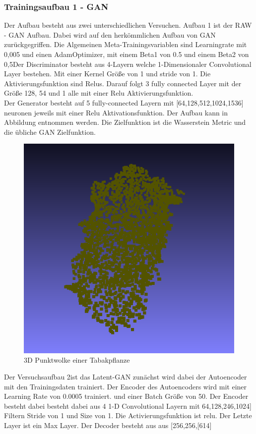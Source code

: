 \documentclass{llncs}
\begin{document}
\subsubsection{Trainingsaufbau 1 - GAN}
Der Aufbau besteht aus zwei unterschiedlichen Versuchen. Aufbau 1 ist der RAW - GAN Aufbau. Dabei wird auf den herkömmlichen Aufbau von GAN zurückgegriffen. Die Algemeinen Meta-Trainingsvariablen sind Learningrate mit 0,005 und einen AdamOptimizer, mit einem Beta1 von 0.5 und einem Beta2 von 0,5Der Discriminator besteht aus 4-Layern welche 1-Dimensionaler Convolutional Layer bestehen. Mit einer Kernel Größe von 1 und stride von 1. Die Aktivierungsfunktion sind Relus. Darauf folgt 3 fully connected Layer mit der Größe 128, 54 und 1 alle mit einer Relu Aktivierungsfunktion.
\\
Der Generator besteht auf 5 fully-connected Layern mit [64,128,512,1024,1536] neuronen jeweils mit einer Relu Aktivationsfunktion. Der Aufbau kann in Abbildung entnommen werden. Die Zielfunktion ist die Wasserstein Metric und die übliche GAN Zielfunktion. 
\begin{figure}[htbp] 
	\centering
	\includegraphics[width=1.2\textwidth]{leaf1.png}
	\caption{3D Punktwolke einer Tabakpflanze}
	\label{fig:Bild2}
\end{figure}

Der Versuchsaufbau 2ist das Latent-GAN zunächst wird dabei der Autoencoder mit den Trainingsdaten trainiert. Der Encoder des Autoencoders wird mit einer Learning Rate von 0.0005 trainiert. und einer Batch Größe von 50. Der Encoder besteht dabei besteht dabei aus 4 1-D Convolutional Layern mit 64,128,246,1024] Filtern Stride von 1 und Size von 1. Die Activierungsfunktion ist relu. Der Letzte Layer ist ein Max Layer. Der Decoder besteht aus aus [256,256,[614]
\end{document}
